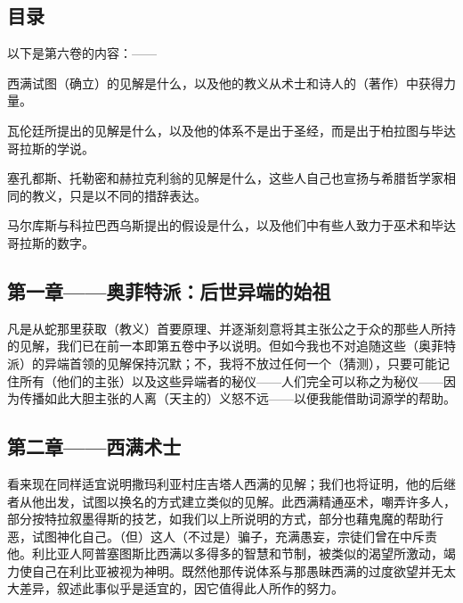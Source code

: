 
\subsection{目录}

以下是第六卷的内容：——\par

西满试图（确立）的见解是什么，以及他的教义从术士和诗人的（著作）中获得力量。\par

瓦伦廷所提出的见解是什么，以及他的体系不是出于圣经，而是出于柏拉图与毕达哥拉斯的学说。\par

塞孔都斯、托勒密和赫拉克利翁的见解是什么，这些人自己也宣扬与希腊哲学家相同的教义，只是以不同的措辞表达。\par

马尔库斯与科拉巴西乌斯提出的假设是什么，以及他们中有些人致力于巫术和毕达哥拉斯的数字。\par


\subsection{第一章——奥菲特派：后世异端的始祖}

凡是从蛇那里获取（教义）首要原理、并逐渐刻意将其主张公之于众的那些人所持的见解，我们已在前一本即第五卷中予以说明。但如今我也不对追随这些（奥菲特派）的异端首领的见解保持沉默；不，我将不放过任何一个（猜测），只要可能记住所有（他们的主张）以及这些异端者的秘仪——人们完全可以称之为秘仪——因为传播如此大胆主张的人离（天主的）义怒不远——以便我能借助词源学的帮助。\par


\subsection{第二章——西满术士}

看来现在同样适宜说明撒玛利亚村庄吉塔人西满的见解；我们也将证明，他的后继者从他出发，试图以换名的方式建立类似的见解。此西满精通巫术，嘲弄许多人，部分按特拉叙墨得斯的技艺，如我们以上所说明的方式，部分也藉鬼魔的帮助行恶，试图神化自己。（但）这人（不过是）骗子，充满愚妄，宗徒们曾在中斥责他。利比亚人阿普塞图斯比西满以多得多的智慧和节制，被类似的渴望所激动，竭力使自己在利比亚被视为神明。既然他那传说体系与那愚昧西满的过度欲望并无太大差异，叙述此事似乎是适宜的，因它值得此人所作的努力。\par

